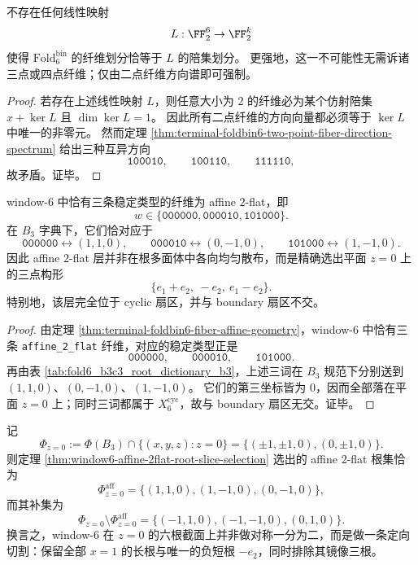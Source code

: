 \begin{theorem}[方向谱版线性核障碍]\label{thm:window6-direction-spectrum-linear-kernel-obstruction}
不存在任何线性映射
\[
L:\FF_2^6\to \FF_2^k
\]
使得 \(\mathrm{Fold}^{\mathrm{bin}}_6\) 的纤维划分恰等于 \(L\) 的陪集划分。
更强地，这一不可能性无需诉诸三点或四点纤维；仅由二点纤维方向谱即可强制。
\end{theorem}

\begin{proof}
若存在上述线性映射 \(L\)，则任意大小为 \(2\) 的纤维必为某个仿射陪集
\(
x+\ker L
\)
且 \(\dim\ker L=1\)。
因此所有二点纤维的方向向量都必须等于 \(\ker L\) 中唯一的非零元。
然而定理 \ref{thm:terminal-foldbin6-two-point-fiber-direction-spectrum} 给出三种互异方向
\[
\texttt{100010},\qquad \texttt{100110},\qquad \texttt{111110},
\]
故矛盾。证毕。
\end{proof}

\begin{theorem}\label{thm:window6-affine-2flat-root-slice-selection}
window-\(6\) 中恰有三条稳定类型的纤维为 affine \(2\)-flat，即
\[
w\in\{\texttt{000000},\texttt{000010},\texttt{101000}\}.
\]
在 \(B_3\) 字典下，它们恰对应于
\[
\texttt{000000}\leftrightarrow (1,1,0),\qquad
\texttt{000010}\leftrightarrow (0,-1,0),\qquad
\texttt{101000}\leftrightarrow (1,-1,0).
\]
因此 affine \(2\)-flat 层并非在根多面体中各向均匀散布，而是精确选出平面 \(z=0\) 上的三点构形
\[
\{e_1+e_2,\ -e_2,\ e_1-e_2\}.
\]
特别地，该层完全位于 cyclic 扇区，并与 boundary 扇区不交。
\end{theorem}

\begin{proof}
由定理 \ref{thm:terminal-foldbin6-fiber-affine-geometry}，window-\(6\) 中恰有三条 \texttt{affine\_2\_flat} 纤维，对应的稳定类型正是
\[
\texttt{000000},\qquad \texttt{000010},\qquad \texttt{101000}.
\]
再由表 \ref{tab:fold6_b3c3_root_dictionary_b3}，上述三词在 \(B_3\) 规范下分别送到
\((1,1,0)\)、\((0,-1,0)\)、\((1,-1,0)\)。
它们的第三坐标皆为 \(0\)，因而全部落在平面 \(z=0\) 上；同时三词都属于 \(X_6^{\mathrm{cyc}}\)，故与 boundary 扇区无交。证毕。
\end{proof}

\begin{proposition}[\(z=0\) 根截面的手征切割]\label{prop:window6-z0-root-slice-chiral-cut}
记
\[
\Phi_{z=0}:=\Phi(B_3)\cap\{(x,y,z):z=0\}
=\{(\pm1,\pm1,0),(0,\pm1,0)\}.
\]
则定理 \ref{thm:window6-affine-2flat-root-slice-selection} 选出的 affine \(2\)-flat 根集恰为
\[
\Phi_{z=0}^{\mathrm{aff}}
=\{(1,1,0),(1,-1,0),(0,-1,0)\},
\]
而其补集为
\[
\Phi_{z=0}\setminus \Phi_{z=0}^{\mathrm{aff}}
=\{(-1,1,0),(-1,-1,0),(0,1,0)\}.
\]
换言之，window-\(6\) 在 \(z=0\) 的六根截面上并非做对称一分为二，而是做一条定向切割：保留全部 \(x=1\) 的长根与唯一的负短根 \(-e_2\)，同时排除其镜像三根。
\end{proposition}

